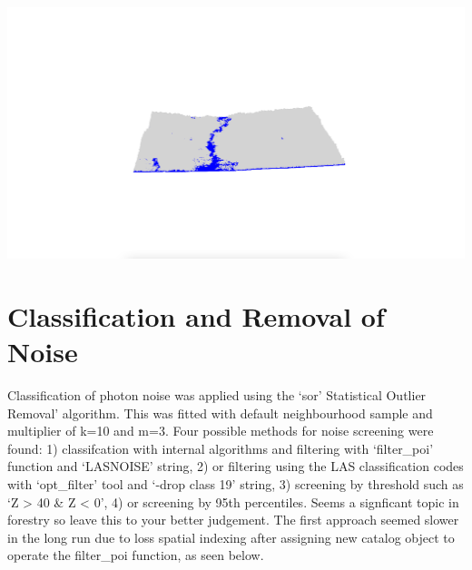\documentclass[
]{article}
\begin{document}
\includegraphics{13_lidR_PointCloud_Processing_files/markdown_pngs/las_tile_ahbau_pmf.png}

\hypertarget{classification-and-removal-of-noise}{%
\section{Classification and Removal of
Noise}\label{classification-and-removal-of-noise}}

Classification of photon noise was applied using the `sor' Statistical
Outlier Removal' algorithm. This was fitted with default neighbourhood
sample and multiplier of k=10 and m=3. Four possible methods for noise
screening were found: 1) classifcation with internal algorithms and
filtering with `filter\_poi' function and `LASNOISE' string, 2) or
filtering using the LAS classification codes with `opt\_filter' tool and
`-drop class 19' string, 3) screening by threshold such as `Z
\textgreater{} 40 \& Z \textless{} 0', 4) or screening by 95th
percentiles. Seems a signficant topic in forestry so leave this to your
better judgement. The first approach seemed slower in the long run due
to loss spatial indexing after assigning new catalog object to operate
the filter\_poi function, as seen below.
\end{document}
